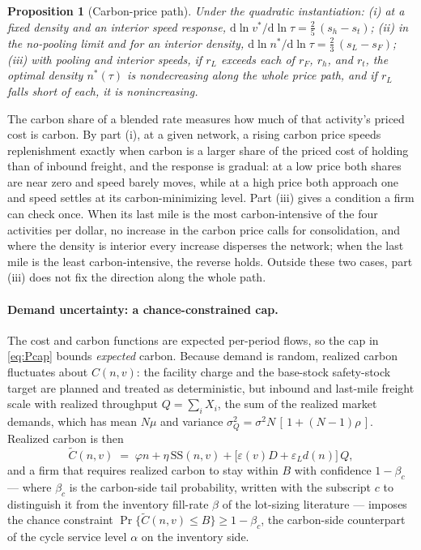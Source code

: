 \documentclass[11pt]{article}
\newtheorem{proposition}{Proposition}
\theoremstyle{definition}
\theoremstyle{remark}
\theoremstyle{plain}
\newcommand{\sstock}{\mathrm{SS}}
\begin{document}
\begin{proposition}[Carbon-price path]\label{prop:path}
Under the quadratic instantiation:
\textup{(i)} at a fixed density and an interior speed response,
$\mathrm d\ln v^*/\mathrm d\ln\tau=\tfrac25\,(s_h-s_t)$;
\textup{(ii)} in the no-pooling limit and for an interior density,
$\mathrm d\ln n^*/\mathrm d\ln\tau=\tfrac23\,(s_L-s_F)$;
\textup{(iii)} with pooling and interior speeds, if $r_L$ exceeds each of $r_F$, $r_h$, and $r_t$, the optimal
density $n^*(\tau)$ is nondecreasing along the whole price path, and if $r_L$ falls short of each, it is
nonincreasing.
\end{proposition}

\noindent The carbon share of a blended rate measures how much of that activity's priced cost is carbon. By
part (i), at a given network, a rising carbon price speeds replenishment exactly when carbon is a larger share of
the priced cost of holding than of inbound freight, and the response is gradual: at a low price both shares are
near zero and speed barely moves, while at a high price both approach one and speed settles at its
carbon-minimizing level. Part (iii) gives a condition a firm can check once. When its last mile is the most
carbon-intensive of the four activities per dollar, no increase in the carbon price calls for consolidation, and
where the density is interior every increase disperses the network; when the last mile is the least
carbon-intensive, the reverse holds. Outside these two cases, part (iii) does not fix the direction along the
whole path.

\paragraph{Demand uncertainty: a chance-constrained cap.} The cost and carbon functions are expected
per-period flows, so the cap in \eqref{eq:Pcap} bounds \emph{expected} carbon. Because demand is random,
realized carbon fluctuates about $C(n,v)$: the facility charge and the base-stock safety-stock target are
planned and treated as deterministic, but inbound and last-mile freight scale with realized throughput
$Q=\sum_i X_i$, the sum of the realized market demands, which has mean $N\mu$ and variance
$\sigma_Q^2=\sigma^2 N\,[\,1+(N-1)\rho\,]$. Realized carbon is then
\begin{equation}\label{eq:Ctilde}
  \tilde C(n,v) \;=\; \varphi n + \eta\,\sstock(n,v) + \big[\varepsilon(v)D+\varepsilon_L d(n)\big]\,Q,
\end{equation}
and a firm that requires realized carbon to stay within $B$ with confidence $1-\beta_c$ --- where $\beta_c$ is
the carbon-side tail probability, written with the subscript $c$ to distinguish it from the inventory
fill-rate $\beta$ of the lot-sizing literature --- imposes the chance
constraint $\Pr\{\tilde C(n,v)\le B\}\ge 1-\beta_c$, the carbon-side counterpart of the cycle service level
$\alpha$ on the inventory side.
\end{document}
